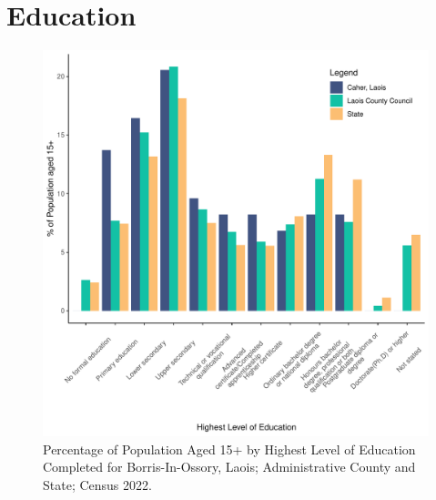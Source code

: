 \documentclass{article}
\begin{document}
\section{Education}\label{sect:Edu}
\begin{figure}[H]
	\centering
	\includegraphics[width = 120mm]{../figures/EduED.pdf}
	\caption{Percentage of Population Aged 15+ by Highest Level of Education Completed for Borris-In-Ossory, Laois; Administrative County and State; Census 2022.}
	\label{fig:vbnv}
	\end{figure}
\end{document}
